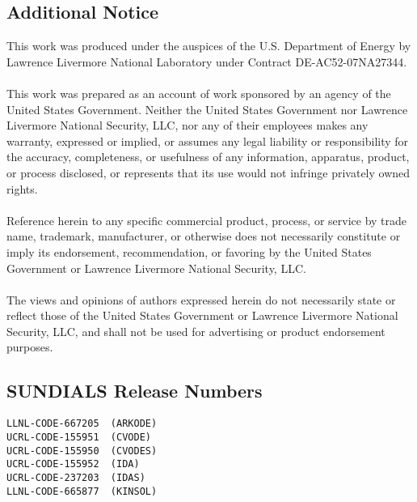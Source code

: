 \subsection{Additional Notice}
This work was produced under the auspices of the U.S. Department of
Energy by Lawrence Livermore National Laboratory under Contract
DE-AC52-07NA27344.
\\
\\
This work was prepared as an account of work sponsored by an agency of
the United States Government. Neither the United States Government nor
Lawrence Livermore National Security, LLC, nor any of their employees
makes any warranty, expressed or implied, or assumes any legal liability
or responsibility for the accuracy, completeness, or usefulness of any
information, apparatus, product, or process disclosed, or represents that
its use would not infringe privately owned rights.
\\
\\
Reference herein to any specific commercial product, process, or service
by trade name, trademark, manufacturer, or otherwise does not necessarily
constitute or imply its endorsement, recommendation, or favoring by the
United States Government or Lawrence Livermore National Security, LLC.
\\
\\
The views and opinions of authors expressed herein do not necessarily
state or reflect those of the United States Government or Lawrence
Livermore National Security, LLC, and shall not be used for advertising
or product endorsement purposes.

\subsection{SUNDIALS Release Numbers}
\begin{verbatim}
LLNL-CODE-667205  (ARKODE)
UCRL-CODE-155951  (CVODE)
UCRL-CODE-155950  (CVODES)
UCRL-CODE-155952  (IDA)
UCRL-CODE-237203  (IDAS)
LLNL-CODE-665877  (KINSOL)
\end{verbatim}
